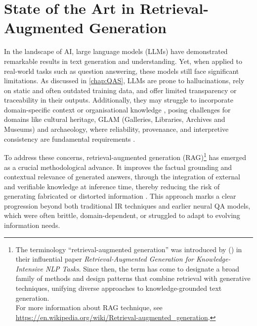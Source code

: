 \chapter{State of the Art in Retrieval-Augmented Generation}
\label{chap:sota}
\begin{spacing}{1.5}
\sloppy
In the landscape of AI, large language models (LLMs) have demonstrated remarkable results in text generation and understanding. Yet, when applied to real-world tasks such as question answering, these models still face significant limitations. As discussed in \autoref{chap:QAS}, LLMs are prone to hallucinations, rely on static and often outdated training data, and offer limited transparency or traceability in their outputs. Additionally, they may struggle to incorporate domain-specific context or organisational knowledge \parencite{vaibhav_retrieval-augmented_2025}, posing challenges for domains like cultural heritage, GLAM (Galleries, Libraries, Archives and Museums) and archaeology, where reliability, provenance, and interpretive consistency are fundamental requirements \citep{di_marcantonio_intelligenza_2024}.

To address these concerns, retrieval-augmented generation (RAG)\footnote{The terminology ``retrieval-augmented generation'' was introduced by \citeauthor{lewis_retrieval-augmented_2020} (\citeyear{lewis_retrieval-augmented_2020}) in their influential paper \textit{Retrieval-Augmented Generation for Knowledge-Intensive NLP Tasks}. Since then, the term has come to designate a broad family of methods and design patterns that combine retrieval with generative techniques, unifying diverse approaches to knowledge-grounded text generation.\\ For more information about RAG technique, see \url{https://en.wikipedia.org/wiki/Retrieval-augmented_generation}.} has emerged as a crucial methodological advance. It improves the factual grounding and contextual relevance of generated answers, through the integration of external and verifiable knowledge at inference time, thereby reducing the risk of generating fabricated or distorted information \citep{martineau_what_2023}. This approach marks a clear progression beyond both traditional IR techniques and earlier neural QA models, which were often brittle, domain-dependent, or struggled to adapt to evolving information needs.


\end{spacing}
